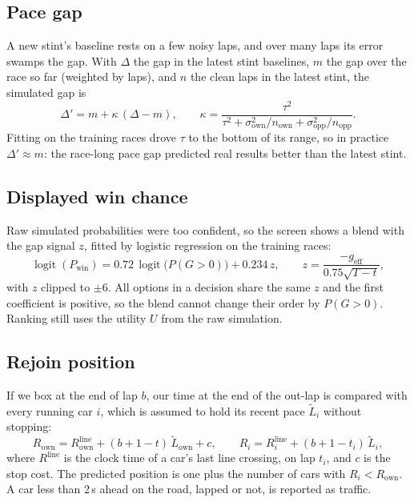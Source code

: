 \documentclass[11pt,a4paper]{article}
\begin{document}
\subsection{Pace gap}
A new stint's baseline rests on a few noisy laps, and over many laps its error swamps the
gap. With $\Delta$ the gap in the latest stint baselines, $m$ the gap over the race so far
(weighted by laps), and $n$ the clean laps in the latest stint, the simulated gap is
\begin{equation}
\Delta' = m + \kappa\,(\Delta-m),
\qquad
\kappa = \frac{\tau^2}{\tau^2+\sigma_{\text{own}}^2/n_{\text{own}}+\sigma_{\text{opp}}^2/n_{\text{opp}}}.
\end{equation}
Fitting on the training races drove $\tau$ to the bottom of its range, so in practice
$\Delta'\approx m$: the race-long pace gap predicted real results better than the latest stint.

\subsection{Displayed win chance}
Raw simulated probabilities were too confident, so the screen shows a blend with the gap
signal $z$, fitted by logistic regression on the training races:
\begin{equation}
\operatorname{logit}(P_{\text{win}}) = 0.72\,\operatorname{logit}\bigl(P(G>0)\bigr) + 0.234\,z,
\qquad
z = \frac{-g_{\text{eff}}}{0.75\sqrt{T-t}},
\end{equation}
with $z$ clipped to $\pm 6$. All options in a decision share the same $z$ and the first
coefficient is positive, so the blend cannot change their order by $P(G>0)$. Ranking still
uses the utility $U$ from the raw simulation.

\subsection{Rejoin position}
If we box at the end of lap $b$, our time at the end of the out-lap is compared with every
running car $i$, which is assumed to hold its recent pace $\tilde{L}_i$ without stopping:
\begin{equation}
R_{\text{own}} = R^{\text{line}}_{\text{own}} + (b+1-t)\,\tilde{L}_{\text{own}} + c,
\qquad
R_i = R^{\text{line}}_i + (b+1-t_i)\,\tilde{L}_i ,
\end{equation}
where $R^{\text{line}}$ is the clock time of a car's last line crossing, on lap $t_i$, and $c$
is the stop cost. The predicted position is one plus the number of cars with
$R_i<R_{\text{own}}$. A car
less than 2\,s ahead on the road, lapped or not, is reported as traffic.
\end{document}
